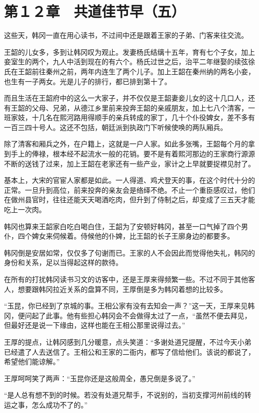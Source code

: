 \section{第１２章　共道佳节早（五）}

这些天，韩冈一直在用心读书，不过间中还是跟着王家的子弟、门客来往交流。

王韶的儿女多，多到让韩冈叹为观止。发妻杨氏结缡十五年，育有七个子女，加上妾室生的两个，九人中活到现在的有六个。杨氏过世之后，治平二年继娶的续弦徐氏在王韶前往秦州之前，两年内连生了两个儿子。加上王韶在秦州纳的两名小妾，也生有一子两女。光是儿子的排行，都已排到第十了。

而且生活在王韶府中的这么一大家子，并不仅仅是王韶妻妾儿女的这十几口人，还有王韶的父母、兄弟，从德江乡里前来投奔王韶的亲戚朋友，加上七八个清客，一班家妓，十几名在熙河路用得顺手的亲兵转成的家丁，几十个仆役婢女，差不多有一百三四十号人。这还不包括，朝廷派到执政门下听候使唤的两队厢兵。

除了清客和厢兵之外，在户籍上，这就是一户人家。如此多张嘴，王韶每个月的拿到手上的俸禄，根本经不起流水一般的花销。要不是有着熙河那边的王家商行源源不断的送钱了过来，加上王韶在老家还有一些产业，家计之上早就要捉襟见肘了。

基本上，大宋的官宦人家都是如此。一人得道、鸡犬登天的事，在这个时代十分的正常。一旦升到高位，前来投奔的亲友会是络绎不绝。不止一个重臣感叹过，他们在做州县官时，往往还能天天喝酒吃肉，但升到了侍制之后，却变成了三五天才能吃上一次肉。

韩冈也算来王韶家白吃白喝白住，王韶为了安顿好韩冈，甚至一口气掉了四个男仆，四个婢女来伺候着。侍候他的仆婢，比王韶的长子王廓身边的都要多。

韩冈倒是安居如常，仅仅多了句谢而已。王家的人不会因此而觉得他失礼，韩冈的身份和关系，足以当得起这样的款待。

在所有的打扰韩冈读书习文的访客中，还是王厚来得频繁一些。不过不同于其他客人，想要跟韩冈拉近关系的盘算不同，王厚倒是多为韩冈着想的比较多。

“玉昆，你已经到了京城的事。王相公家有没有去知会一声？”这一天，王厚来见韩冈，便问起了此事。他有些担心韩冈会不会做得太过了一点，“虽然不便去拜见，但最好还是说一下缘由，这样也能在王相公那里说得过去。”

王厚的提点，让韩冈感到几分暖意，点头笑道：“多谢处道兄提醒，不过今天小弟已经遣了人去送信了。王相公和王家的二衙内，都写了信给他们。该说的都说了，希望他们能谅解。”

王厚呵呵笑了两声：“玉昆你还是这般周全，愚兄倒是多说了。”

“是人总有想不到的时候。若没有处道兄帮手，不说别的，当初支撑河州前线的转运之事，怎么成功不了的。”

